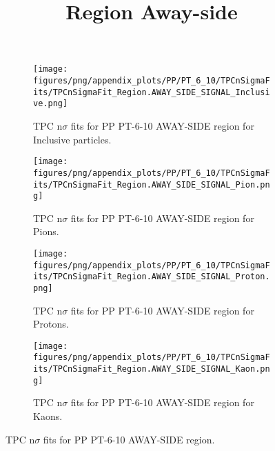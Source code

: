             \begin{figure}[H]
                \title{Region Away-side}
                \begin{subfigure}[b]{0.5\textwidth}
                    \centering
                    \texttt{[image: figures/png/appendix\_plots/PP/PT\_6\_10/TPCnSigmaFits/TPCnSigmaFit\_Region.AWAY\_SIDE\_SIGNAL\_Inclusive.png]}
                    \caption{TPC n$\sigma$ fits for PP PT-6-10 AWAY-SIDE region for Inclusive particles.}
                    \label{fig:appendix_PP_PT-6-10_AWAY_SIDE_SIGNAL_Inclusive}
                \end{subfigure}
                \begin{subfigure}[b]{0.5\textwidth}
                    \centering
                    \texttt{[image: figures/png/appendix\_plots/PP/PT\_6\_10/TPCnSigmaFits/TPCnSigmaFit\_Region.AWAY\_SIDE\_SIGNAL\_Pion.png]}
                    \caption{TPC n$\sigma$ fits for PP PT-6-10 AWAY-SIDE region for Pions.}
                    \label{fig:appendix_PP_PT-6-10_AWAY_SIDE_SIGNAL_Pion}
                \end{subfigure}
                \begin{subfigure}[b]{0.5\textwidth}
                    \centering
                    \texttt{[image: figures/png/appendix\_plots/PP/PT\_6\_10/TPCnSigmaFits/TPCnSigmaFit\_Region.AWAY\_SIDE\_SIGNAL\_Proton.png]}
                    \caption{TPC n$\sigma$ fits for PP PT-6-10 AWAY-SIDE region for Protons.}
                    \label{fig:appendix_PP_PT-6-10_AWAY_SIDE_SIGNAL_Proton}
                \end{subfigure}
                \begin{subfigure}[b]{0.5\textwidth}
                    \centering
                    \texttt{[image: figures/png/appendix\_plots/PP/PT\_6\_10/TPCnSigmaFits/TPCnSigmaFit\_Region.AWAY\_SIDE\_SIGNAL\_Kaon.png]}
                    \caption{TPC n$\sigma$ fits for PP PT-6-10 AWAY-SIDE region for Kaons.}
                    \label{fig:appendix_PP_PT-6-10_AWAY_SIDE_SIGNAL_Kaon}
                \end{subfigure}
                \caption{TPC n$\sigma$ fits for PP PT-6-10 AWAY-SIDE region.}
                \label{fig:appendix_PP_PT-6-10_AWAY_SIDE_SIGNAL}
            \end{figure}
